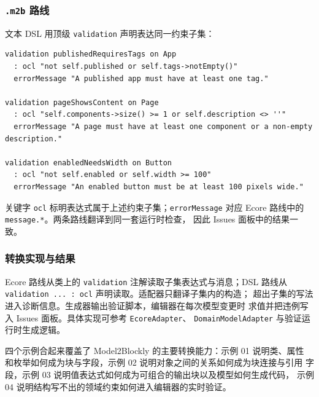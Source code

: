 \subsubsection{\texttt{.m2b} 路线}

文本 DSL 用顶级 \texttt{validation} 声明表达同一约束子集：

\begin{lstlisting}[style=tfmm2b, captionpos=t,
caption={约束子集的 \texttt{.m2b} 定义},
label={lst:validated-app-m2b}]
validation publishedRequiresTags on App
  : ocl "not self.published or self.tags->notEmpty()"
  errorMessage "A published app must have at least one tag."

validation pageShowsContent on Page
  : ocl "self.components->size() >= 1 or self.description <> ''"
  errorMessage "A page must have at least one component or a non-empty description."

validation enabledNeedsWidth on Button
  : ocl "not self.enabled or self.width >= 100"
  errorMessage "An enabled button must be at least 100 pixels wide."
\end{lstlisting}

关键字 \texttt{ocl} 标明表达式属于上述约束子集；\texttt{errorMessage}
对应 Ecore 路线中的 \texttt{message.*}。两条路线翻译到同一套运行时检查，
因此 Issues 面板中的结果一致。

\subsubsection{转换实现与结果}

Ecore 路线从类上的 \texttt{validation} 注解读取子集表达式与消息；DSL
路线从 \texttt{validation ... : ocl} 声明读取。适配器只翻译子集内的构造；
超出子集的写法进入诊断信息。生成器输出验证脚本，编辑器在每次模型变更时
求值并把违例写入 Issues 面板。具体实现可参考 \texttt{EcoreAdapter}、
\texttt{DomainModelAdapter} 与验证运行时生成逻辑。

四个示例合起来覆盖了 Model2Blockly 的主要转换能力：示例 01 说明类、属性
和枚举如何成为块与字段，示例 02 说明对象之间的关系如何成为块连接与引用
字段，示例 03 说明值表达式如何成为可组合的输出块以及模型如何生成代码，
示例 04 说明结构写不出的领域约束如何进入编辑器的实时验证。
\FloatBarrier
\endinput

\section{一次执行的内部流程}
\label{sec:flujo-interno-ejecucion}

在集成式执行中，用户选择的操作由 \texttt{GenerateBlocklyEditorHandler}
处理。该类根据文件扩展名选择两条加载分支之一。图
\ref{fig:flujo-interno-ejecucion} 使用已实现组件的名称表示这一过程。
该图描述一次生成请求在插件内部实际经过的具体轨迹。

